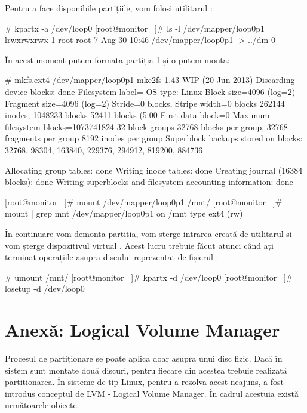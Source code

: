 Pentru a face disponibile partițiile, vom folosi utilitarul :

\begin{screen}
# kpartx -a /dev/loop0
[root@monitor ~]# ls -l /dev/mapper/loop0p1
lrwxrwxrwx 1 root root 7 Aug 30 10:46 /dev/mapper/loop0p1 -> ../dm-0
\end{screen}

În acest moment putem formata partiția 1 și o putem monta:

\begin{screen}
# mkfs.ext4 /dev/mapper/loop0p1
mke2fs 1.43-WIP (20-Jun-2013)
Discarding device blocks: done
Filesystem label=
OS type: Linux
Block size=4096 (log=2)
Fragment size=4096 (log=2)
Stride=0 blocks, Stripe width=0 blocks
262144 inodes, 1048233 blocks
52411 blocks (5.00%
First data block=0
Maximum filesystem blocks=1073741824
32 block groups
32768 blocks per group, 32768 fragments per group
8192 inodes per group
Superblock backups stored on blocks:
        32768, 98304, 163840, 229376, 294912, 819200, 884736


Allocating group tables: done
Writing inode tables: done
Creating journal (16384 blocks): done
Writing superblocks and filesystem accounting information: done


[root@monitor ~]# mount /dev/mapper/loop0p1 /mnt/
[root@monitor ~]# mount | grep mnt
/dev/mapper/loop0p1 on /mnt type ext4 (rw)
\end{screen}

În continuare vom demonta partiția, vom șterge intrarea creată de utilitarul
 și vom șterge dispozitivul virtual . Acest lucru
trebuie făcut atunci când ați terminat operațiile asupra discului reprezentat de
fișierul :

\begin{screen}
# umount /mnt/
[root@monitor ~]# kpartx -d /dev/loop0
[root@monitor ~]# losetup -d /dev/loop0
\end{screen}

\section{Anexă: Logical Volume Manager}
\label{sec:storage-lvm}

Procesul de partiționare se poate aplica doar asupra unui disc fizic. Dacă în
sistem sunt montate două discuri, pentru fiecare din acestea trebuie realizată
partiționarea. În sisteme de tip Linux, pentru a rezolva acest neajuns, a fost
introdus conceptul de LVM  - Logical Volume
Manager. În cadrul acestuia există următoarele obiecte:

